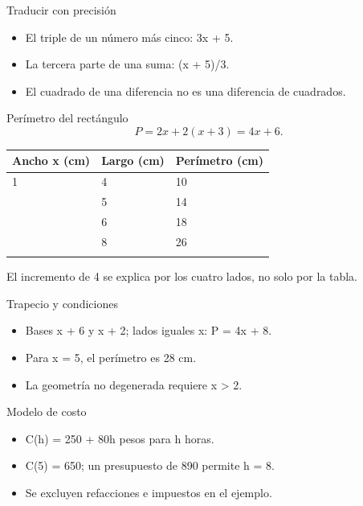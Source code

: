 \documentclass[
	spanish,
	aspectratio=1610,
	xcolor={dvipsnames,table}
]{beamer}
\begin{document}
\begin{frame}{Traducir con precisión}
\fontsize{14}{18}\selectfont\begin{itemize}\setlength{\itemsep}{.45cm}
\item El triple de un número más cinco: 3x + 5.
\item La tercera parte de una suma: (x + 5)/3.
\item El cuadrado de una diferencia no es una diferencia de cuadrados.
\end{itemize}
\end{frame}
\begin{frame}{Perímetro del rectángulo}
\fontsize{14}{18}\selectfont\[P=2x+2(x+3)=4x+6.\]
\small\renewcommand{\arraystretch}{1.45}\begin{tabularx}{\linewidth}{X|X|X}\toprule
\textbf{Ancho x (cm)} & \textbf{Largo (cm)} & \textbf{Perímetro (cm)}\\\midrule
1 & 4 & 10\\\addlinespace
2 & 5 & 14\\\addlinespace
3 & 6 & 18\\\addlinespace
5 & 8 & 26\\\addlinespace
\bottomrule\end{tabularx}\par\vspace{.3cm}\fontsize{14}{18}\selectfont El incremento de 4 se explica por los cuatro lados, no solo por la tabla.
\end{frame}
\begin{frame}{Trapecio y condiciones}
\fontsize{14}{18}\selectfont\begin{itemize}\setlength{\itemsep}{.45cm}
\item Bases x + 6 y x + 2; lados iguales x: P = 4x + 8.
\item Para x = 5, el perímetro es 28 cm.
\item La geometría no degenerada requiere x > 2.
\end{itemize}
\end{frame}
\begin{frame}{Modelo de costo}
\fontsize{14}{18}\selectfont\begin{itemize}\setlength{\itemsep}{.45cm}
\item C(h) = 250 + 80h pesos para h horas.
\item C(5) = 650; un presupuesto de 890 permite h = 8.
\item Se excluyen refacciones e impuestos en el ejemplo.
\end{itemize}
\end{frame}
\end{document}
